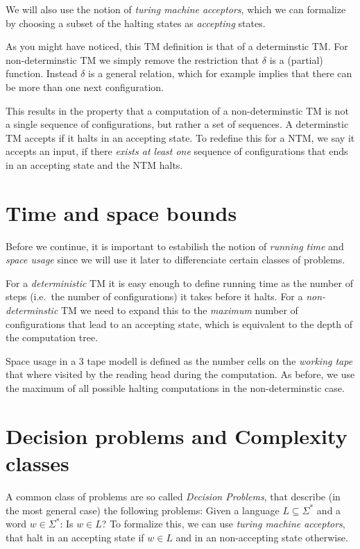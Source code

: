 We will also use the notion of \emph{turing machine acceptors}, which we
can formalize by choosing a subset of the halting states as
\emph{accepting} states.

As you might have noticed, this TM definition is that of a determinstic
TM. For non-determinstic TM we simply remove the restriction that
$\delta$ is a (partial) function. Instead $\delta$ is a general
relation, which for example implies that there can be more than one next
configuration.

This results in the property that a computation of a non-determinstic TM
is not a single sequence of configurations, but rather a set of
sequences. A determinstic TM accepts if it halts in an accepting state.
To redefine this for a NTM, we say it accepts an input, if there
\emph{exists at least one} sequence of configurations that ends in an
accepting state and the NTM halts.

\section{Time and space bounds}\label{time-and-space-bounds}

Before we continue, it is important to estabilish the notion of
\emph{running time} and \emph{space usage} since we will use it later to
differenciate certain classes of problems.

For a \emph{deterministic} TM it is easy enough to define running time
as the number of steps (i.e.~the number of configurations) it takes
before it halts. For a \emph{non-determinstic} TM we need to expand this
to the \emph{maximum} number of configurations that lead to an accepting
state, which is equivalent to the depth of the computation tree.

Space usage in a 3 tape modell is defined as the number cells on the
\emph{working tape} that where visited by the reading head during the
computation. As before, we use the maximum of all possible halting
computations in the non-determinstic case.

\section{Decision problems and Complexity
classes}\label{decision-problems-and-complexity-classes}

A common class of problems are so called \emph{Decision Problems}, that
describe (in the most general case) the following problems: Given a
language $L \subseteq \Sigma^*$ and a word $w \in \Sigma^*$: Is
$w \in L$? To formalize this, we can use \emph{turing machine
acceptors}, that halt in an accepting state if $w \in L$ and in an
non-accepting state otherwise.

